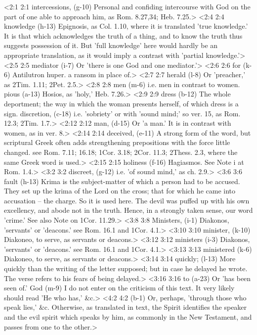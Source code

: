 <2:1 2:1  intercessions, (g-10)  Personal and confiding intercourse with God on the part of  one able to approach him, as Rom. 8.27,34; Heb. 7.25.>
<2:4 2:4  knowledge (h-13)  Epignosis, as Col. 1.10, where it is translated 'true  knowledge.' It is that which acknowledges the truth of a thing,  and to know the truth thus suggests possession of it. But 'full  knowledge' here would hardly be an appropriate translation, as  it would imply a contrast with 'partial knowledge.'>
<2:5 2:5  mediator (i-7)  Or 'there is one God and one mediator.'>
<2:6 2:6  for (k-6)  Antilutron huper. a ransom in place of.>
<2:7 2:7  herald (l-8)  Or 'preacher,' as 2Tim. 1.11; 2Pet. 2.5.>
<2:8 2:8  men (m-6)  i.e. men in contrast to women.
  pious (a-13)  Hosios, as 'holy,' Heb. 7.26.>
<2:9 2:9  dress (b-12)  The whole deportment; the way in which the woman presents  herself, of which dress is a sign.
  discretion, (c-18)  i.e. 'sobriety' or with 'sound mind;' so ver. 15, as Rom.  12.3; 2Tim. 1.7.>
<2:12 2:12  man, (d-15)  Or 'a man.' It is in contrast with women, as in ver. 8.>
<2:14 2:14  deceived, (e-11)  A strong form of the word, but scriptural Greek often adds  strengthening prepositions with the force little changed. see  Rom. 7.11; 16.18; 1Cor. 3.18; 2Cor. 11.3; 2Thess. 2.3, where  the same Greek word is used.>
<2:15 2:15  holiness (f-16)  Hagiasmos. See Note i at Rom. 1.4.>
<3:2 3:2  discreet, (g-12)  i.e. 'of sound mind,' as ch. 2.9.>
<3:6 3:6  fault (h-13)  Krima is the subject-matter of which a person had to be  accused. They set up the krima of the Lord on the cross; that  for which he came into accusation -- the charge. So it is used  here. The devil was puffed up with his own excellency, and  abode not in the truth. Hence, in a strongly taken sense, our  word 'crime.' See also Note on 1Cor. 11.29.>
<3:8 3:8  Ministers, (i-1)  Diakonos, 'servants' or 'deacons.' see Rom. 16.1 and 1Cor. 4.1.>
<3:10 3:10  minister, (k-10)  Diakoneo, to serve, as servants or deacons.>
<3:12 3:12  ministers (i-3)  Diakonos, 'servants' or 'deacons.' see Rom. 16.1 and 1Cor. 4.1.>
<3:13 3:13  ministered (k-6)  Diakoneo, to serve, as servants or deacons.>
<3:14 3:14  quickly; (l-13)  More quickly than the writing of the letter supposed; but in  case he delayed he wrote. The verse refers to his fears of  being delayed.>
<3:16 3:16  to (a-23)  Or 'has been seen of.'
  God (m-9)  I do not enter on the criticism of this text. It very likely  should read 'He who has,' &c.>
<4:2 4:2   (b-1)  Or, perhaps, 'through those who speak lies,' &c. Otherwise,  as translated in text, the Spirit identifies the speaker and  the evil spirit which speaks by him, as commonly in the New  Testament, and passes from one to the other.>
